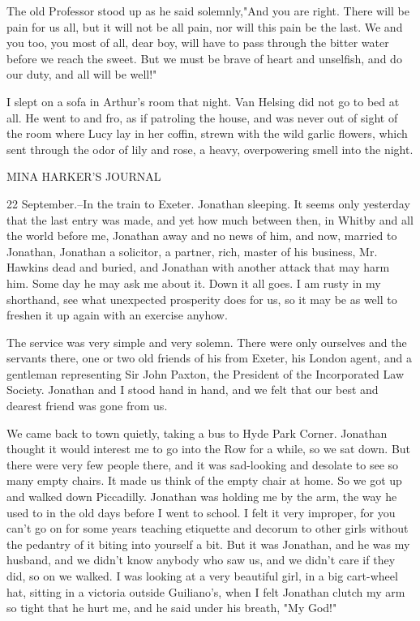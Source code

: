 The old Professor stood up as he said solemnly,"And you are right. There will be pain for us all, but it will not be all pain, nor will this pain be the last. We and you too, you most of all, dear boy, will have to pass through the bitter water before we reach the sweet. But we must be brave of heart and unselfish, and do our duty, and all will be well!" 

I slept on a sofa in Arthur's room that night. Van Helsing did not go to bed at all. He went to and fro, as if patroling the house, and was never out of sight of the room where Lucy lay in her coffin, strewn with the wild garlic flowers, which sent through the odor of lily and rose, a heavy, overpowering smell into the night. 

MINA HARKER'S JOURNAL 

22 September.--In the train to Exeter. Jonathan sleeping. It seems only yesterday that the last entry was made, and yet how much between then, in Whitby and all the world before me, Jonathan away and no news of him, and now, married to Jonathan, Jonathan a solicitor, a partner, rich, master of his business, Mr. Hawkins dead and buried, and Jonathan with another attack that may harm him. Some day he may ask me about it. Down it all goes. I am rusty in my shorthand, see what unexpected prosperity does for us, so it may be as well to freshen it up again with an exercise anyhow. 

The service was very simple and very solemn. There were only ourselves and the servants there, one or two old friends of his from Exeter, his London agent, and a gentleman representing Sir John Paxton, the President of the Incorporated Law Society. Jonathan and I stood hand in hand, and we felt that our best and dearest friend was gone from us. 

We came back to town quietly, taking a bus to Hyde Park Corner. Jonathan thought it would interest me to go into the Row for a while, so we sat down. But there were very few people there, and it was sad-looking and desolate to see so many empty chairs. It made us think of the empty chair at home. So we got up and walked down Piccadilly. Jonathan was holding me by the arm, the way he used to in the old days before I went to school. I felt it very improper, for you can't go on for some years teaching etiquette and decorum to other girls without the pedantry of it biting into yourself a bit. But it was Jonathan, and he was my husband, and we didn't know anybody who saw us, and we didn't care if they did, so on we walked. I was looking at a very beautiful girl, in a big cart-wheel hat, sitting in a victoria outside Guiliano's, when I felt Jonathan clutch my arm so tight that he hurt me, and he said under his breath, "My God!" 

